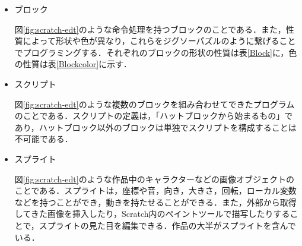 \documentclass[11pt]{jreport}
\begin{document}
\begin{itemize}
  \item ブロック

図\ref{fig:scratch-edt}のような命令処理を持つブロックのことである．また，性質によって形状や色が異なり，これらをジグソーパズルのように繋げることでプログラミングする．それぞれのブロックの形状の性質は表\ref{Block}に，色の性質は表\ref{Blockcolor}に示す．

  \item スクリプト

図\ref{fig:scratch-edt}のような複数のブロックを組み合わせてできたプログラムのことである．スクリプトの定義は，「ハットブロックから始まるもの」であり，ハットブロック以外のブロックは単独でスクリプトを構成することは不可能である．

  \item スプライト

図\ref{fig:scratch-edt}のような作品中のキャラクターなどの画像オブジェクトのことである．スプライトは，座標や音，向き，大きさ，回転，ローカル変数などを持つことができ，動きを持たせることができる．また，外部から取得してきた画像を挿入したり，Scratch内のペイントツールで描写したりすることで，スプライトの見た目を編集できる．作品の大半がスプライトを含んでいる．

\end{itemize}
\end{document}
